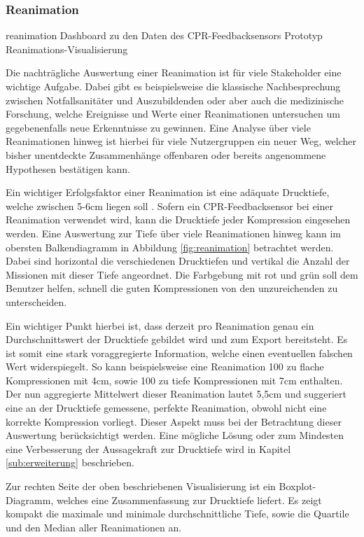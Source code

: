 \subsubsection{Reanimation}
\label{subsub:reanimation}
\bildbreit
{reanimation}
{Dashboard zu den Daten des \gls{CPR-Feedbacksensor}s}
{Prototyp Reanimations-Visualisierung}

Die nachträgliche Auswertung einer Reanimation ist für viele Stakeholder eine wichtige Aufgabe.
Dabei gibt es beispielsweise die klassische Nachbesprechung zwischen Notfallsanitäter und Auszubildenden oder aber auch die medizinische Forschung, welche Ereignisse und Werte einer Reanimationen untersuchen um gegebenenfalls neue Erkenntnisse zu gewinnen.
Eine Analyse über viele Reanimationen hinweg ist hierbei für viele Nutzergruppen ein neuer Weg, welcher bisher unentdeckte Zusammenhänge offenbaren oder bereits angenommene Hypothesen bestätigen kann.

Ein wichtiger Erfolgsfaktor einer Reanimation ist eine adäquate Drucktiefe, welche zwischen 5-6cm liegen soll  \cite{Monsieurs.2015}.
Sofern ein \gls{CPR-Feedbacksensor} bei einer Reanimation verwendet wird, kann die Drucktiefe jeder Kompression eingesehen werden. %
Eine Auswertung zur Tiefe über viele Reanimationen hinweg kann im obersten Balkendiagramm in Abbildung \ref{fig:reanimation} betrachtet werden.
Dabei sind horizontal die verschiedenen Drucktiefen und vertikal die Anzahl der Missionen mit dieser Tiefe angeordnet.
Die Farbgebung mit rot und grün soll dem Benutzer helfen, schnell die \glqq guten\grqq{} Kompressionen von den unzureichenden zu unterscheiden.

Ein wichtiger Punkt hierbei ist, dass derzeit pro Reanimation genau ein Durchschnittswert der Drucktiefe gebildet wird und zum Export bereitsteht.
Es ist somit eine stark voraggregierte Information, welche einen eventuellen falschen Wert widerspiegelt. 
So kann beispielsweise eine Reanimation 100 zu flache Kompressionen mit 4cm, sowie 100 zu tiefe Kompressionen  mit 7cm enthalten.
Der nun aggregierte Mittelwert dieser Reanimation lautet 5,5cm und suggeriert eine an der Drucktiefe gemessene, \glqq perfekte\grqq{} Reanimation, obwohl nicht eine korrekte Kompression vorliegt.
Dieser Aspekt muss bei der Betrachtung dieser Auswertung berücksichtigt werden.
Eine mögliche Lösung oder zum Mindesten eine Verbesserung der Aussagekraft zur Drucktiefe wird in Kapitel \ref{sub:erweiterung} beschrieben.

Zur rechten Seite der oben beschriebenen Visualisierung ist ein Boxplot-Diagramm, welches eine Zusammenfassung zur Drucktiefe liefert.
Es zeigt kompakt die maximale und minimale durchschnittliche Tiefe, sowie die Quartile und den Median aller Reanimationen an.

